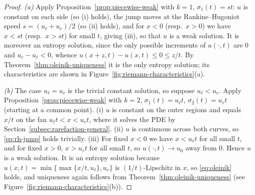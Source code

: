\begin{proof}
\emph{(a)} Apply Proposition~\ref{prop:piecewise-weak} with $k=1$,
$\sigma_1(t)=st$: $u$ is constant on each side (so (i) holds), the jump moves at
the Rankine--Hugoniot speed $s=(u_\ell+u_r)/2$ (so (ii) holds), and for
$x<0$ (resp.\ $x>0$) we have $x<st$ (resp.\ $x>st$) for small $t$, giving
(iii), so that $u$ is a weak solution. It is moreover an entropy solution, since
the only possible increments of $u(\cdot,t)$ are $0$ and $u_r-u_\ell<0$, whence
$u(x+z,t)-u(x,t)\le0\le z/t$. By Theorem~\ref{thm:oleinik-uniqueness} it is the
only entropy solution; its characteristics are shown in
Figure~\ref{fig:riemann-characteristics}(a).

\emph{(b)} The case $u_\ell=u_r$ is the trivial constant solution, so
suppose $u_\ell<u_r$. Apply Proposition~\ref{prop:piecewise-weak} with
$k=2$, $\sigma_1(t)=u_\ell t$, $\sigma_2(t)=u_r t$ (starting at a common point).
(i) $u$ is constant on the outer regions and equals $x/t$ on the fan
$u_\ell t<x<u_r t$, where it solves the PDE by
Section~\ref{subsec:rarefaction-general}. (ii) $u$ is continuous across
both curves, so \eqref{eq:rh-jump} holds trivially. (iii) For fixed
$x<0$ we have $x<u_\ell t$ for all small $t$, and for fixed $x>0$,
$x>u_rt$ for all small $t$, so $u(\cdot,t)\to u_0$ away from $0$. Hence
$u$ is a weak solution. It is an entropy solution because
$u(x,t)=\min\{\max\{x/t,u_\ell\},u_r\}$ is $(1/t)$-Lipschitz in $x$, so
\eqref{eq:oleinik} holds, and uniqueness again follows from
Theorem~\ref{thm:oleinik-uniqueness} (see Figure~\ref{fig:riemann-characteristics}(b)).
\end{proof}

